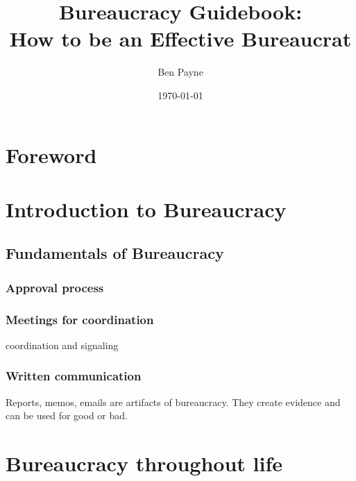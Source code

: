 \documentclass{book}
\title{Bureaucracy Guidebook: \\How to be an Effective Bureaucrat}
\author{Ben Payne}
\date{\today}
\begin{document}
\maketitle
\frontmatter %



\chapter*{Foreword}%


\tableofcontents

\mainmatter %



\chapter{Introduction to Bureaucracy}

\section{Fundamentals of Bureaucracy}









\subsection{Approval process}
\subsection{Meetings for coordination}
coordination and signaling
\subsection{Written communication}
Reports, memos, emails are artifacts of bureaucracy. They create evidence and can be used for good or bad. 






\chapter{Bureaucracy throughout life}

\end{document}
